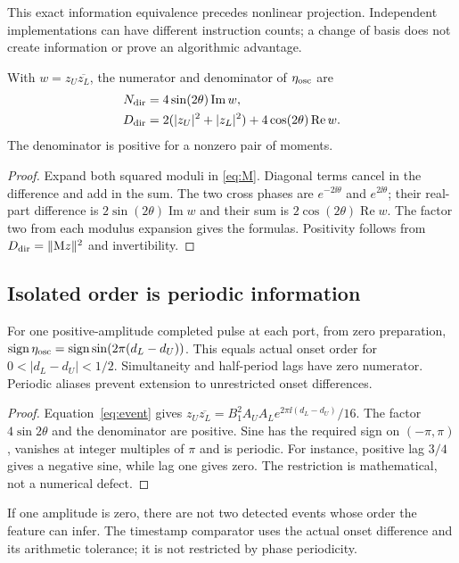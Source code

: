 This exact information equivalence precedes nonlinear projection. Independent implementations can have different instruction counts; a change of basis does not create information or prove an algorithmic advantage.

\begin{proposition}\label{prop:momentread}
With $w=z_U\overline{z_L}$, the numerator and denominator of $\eta_{\rm osc}$ are
\begin{equation}\label{eq:momentread}
 \begin{aligned}
 N_{\rm dir}&=4\sin(2\theta)\operatorname{Im}w,\\
 D_{\rm dir}&=2(|z_U|^2+|z_L|^2)+4\cos(2\theta)\operatorname{Re}w .
 \end{aligned}
\end{equation}
The denominator is positive for a nonzero pair of moments.
\end{proposition}
\begin{proof}
Expand both squared moduli in \eqref{eq:M}. Diagonal terms cancel in the difference and add in the sum. The two cross phases are $e^{-2\ii\theta}$ and $e^{2\ii\theta}$; their real-part difference is $2\sin(2\theta)\operatorname{Im}w$ and their sum is $2\cos(2\theta)\operatorname{Re}w$. The factor two from each modulus expansion gives the formulas. Positivity follows from $D_{\rm dir}=\lVert\mathrm M z\rVert^2$ and invertibility.
\end{proof}

\subsection{Isolated order is periodic information}
\begin{theorem}\label{thm:isolated}
For one positive-amplitude completed pulse at each port, from zero preparation, $\operatorname{sign}\eta_{\rm osc}=\operatorname{sign}\sin(2\pi(d_L-d_U))$. This equals actual onset order for $0<|d_L-d_U|<1/2$. Simultaneity and half-period lags have zero numerator. Periodic aliases prevent extension to unrestricted onset differences.
\end{theorem}
\begin{proof}
Equation~\eqref{eq:event} gives
$z_U\overline{z_L}=B_1^2A_UA_Le^{2\pi\ii(d_L-d_U)}/16$.
The factor $4\sin2\theta$ and the denominator are positive. Sine has the required sign on $(-\pi,\pi)$, vanishes at integer multiples of $\pi$ and is periodic. For instance, positive lag $3/4$ gives a negative sine, while lag one gives zero. The restriction is mathematical, not a numerical defect.
\end{proof}
If one amplitude is zero, there are not two detected events whose order the feature can infer. The timestamp comparator uses the actual onset difference and its arithmetic tolerance; it is not restricted by phase periodicity.

